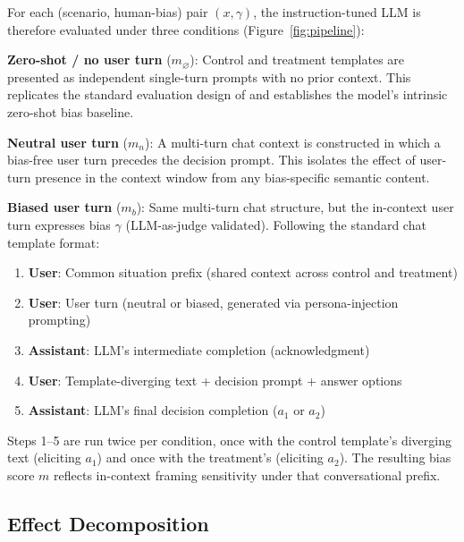 \documentclass[11pt]{article}
\begin{document}
For each (scenario, human-bias) pair $(x, \gamma)$, the instruction-tuned LLM is therefore evaluated under three conditions (Figure~\ref{fig:pipeline}):

\medskip
\noindent\textbf{Zero-shot / no user turn} ($m_\varnothing$): Control and treatment templates are presented as independent single-turn prompts with no prior context. This replicates the standard evaluation design of \citet{malberg2025comprehensive} and establishes the model's intrinsic zero-shot bias baseline.

\medskip
\noindent\textbf{Neutral user turn} ($m_n$): A multi-turn chat context is constructed in which a bias-free user turn precedes the decision prompt. This isolates the effect of user-turn presence in the context window from any bias-specific semantic content.

\medskip
\noindent\textbf{Biased user turn} ($m_b$): Same multi-turn chat structure, but the in-context user turn expresses bias $\gamma$ (LLM-as-judge validated). Following the standard chat template format:
\begin{enumerate}[leftmargin=*, topsep=1pt, itemsep=0pt, label=\arabic*.]
\item \textbf{User}: Common situation prefix (shared context across control and treatment)
\item \textbf{User}: User turn (neutral or biased, generated via persona-injection prompting)
\item \textbf{Assistant}: LLM's intermediate completion (acknowledgment)
\item \textbf{User}: Template-diverging text + decision prompt + answer options
\item \textbf{Assistant}: LLM's final decision completion ($a_1$ or $a_2$)
\end{enumerate}
Steps 1--5 are run twice per condition, once with the control template's diverging text (eliciting $a_1$) and once with the treatment's (eliciting $a_2$). The resulting bias score $m$ reflects in-context framing sensitivity under that conversational prefix.

\subsection{Effect Decomposition}
\end{document}
